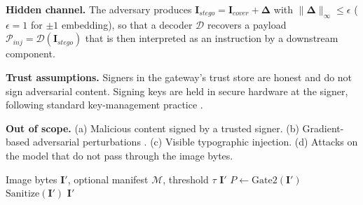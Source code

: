 \documentclass[conference]{IEEEtran}
\begin{document}
\textbf{Hidden channel.} The adversary produces $\mathbf{I}_{stego} = \mathbf{I}_{cover} + \mathbf{\Delta}$ with $\|\mathbf{\Delta}\|_\infty \le \epsilon$ ($\epsilon = 1$ for $\pm 1$ embedding), so that a decoder $\mathcal{D}$ recovers a payload $\mathcal{P}_{inj} = \mathcal{D}(\mathbf{I}_{stego})$ that is then interpreted as an instruction by a downstream component.

\textbf{Trust assumptions.} Signers in the gateway's trust store are honest and do not sign adversarial content. Signing keys are held in secure hardware at the signer, following standard key-management practice \cite{barker2020recommendation}.

\textbf{Out of scope.} (a) Malicious content signed by a trusted signer. (b) Gradient-based adversarial perturbations \cite{qi2024visual, carlini2023aligned}. (c) Visible typographic injection. (d) Attacks on the model that do not pass through the image bytes.

\begin{algorithm}[t]
\caption{CPS-Gateway routing (detect-then-sanitize mode)}
\label{alg:routing}
\begin{algorithmic}[1]
\REQUIRE Image bytes $\mathbf{I}'$, optional manifest $\mathcal{M}$, threshold $\tau$
    \RETURN $\mathbf{I}'$ 
\ENDIF
\STATE $P \leftarrow \text{Gate2}(\mathbf{I}')$
    \RETURN $\text{Sanitize}(\mathbf{I}')$
\ENDIF
\RETURN $\mathbf{I}'$
\end{algorithmic}
\end{algorithm}
\end{document}
